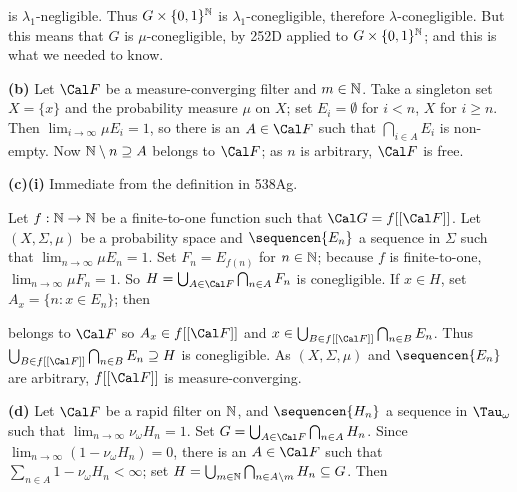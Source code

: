 {

\noindent is $\lambda_1$-negligible.
Thus $G\times\{0,1\}^{\Bbb N}$ is $\lambda_1$-conegligible, therefore
$\lambda$-conegligible.   But this means that $G$ is $\mu$-conegligible, by
252D applied to $G\times\{0,1\}^{\Bbb N}$;  and this is what we
needed to know.

\medskip

{\bf (b)} Let $\Cal F$ be a measure-converging filter and $m\in\Bbb N$.
Take a singleton set $X=\{x\}$ and the probability measure $\mu$ on $X$;
set $E_i=\emptyset$ for $i<n$, $X$ for $i\ge n$.   Then
$\lim_{i\to\infty}\mu E_i=1$, so there is an $A\in\Cal F$ such that
$\bigcap_{i\in A}E_i$ is non-empty.   Now $\Bbb N\setminus n\supseteq A$
belongs to $\Cal F$;  as $n$ is arbitrary, $\Cal F$ is free.

\medskip

{\bf (c)(i)} Immediate from the definition in 538Ag.

\medskip

 Let $f:\Bbb N\to\Bbb N$ be a finite-to-one function such
that $\Cal G=f[[\Cal F]]$.
Let $(X,\Sigma,\mu)$ be a probability space and
$\sequencen{E_n}$ a sequence in $\Sigma$ such that
$\lim_{n\to\infty}\mu E_n=1$.   Set $F_n=E_{f(n)}$ for $n\in\Bbb N$;
because $f$ is finite-to-one, $\lim_{n\to\infty}\mu F_n=1$.   So
$H=\bigcup_{A\in\Cal F}\bigcap_{n\in A}F_n$ is conegligible.   If
$x\in H$, set $A_x=\{n:x\in E_n\}$;  then


\noindent belongs to $\Cal F$ so $A_x\in f[[\Cal F]]$ and
$x\in\bigcup_{B\in f[[\Cal F]]}\bigcap_{n\in B}E_n$.   Thus
$\bigcup_{B\in f[[\Cal F]]}\bigcap_{n\in B}E_n\supseteq H$ is conegligible.
As $(X,\Sigma,\mu)$ and $\sequencen{E_n}$ are arbitrary, $f[[\Cal F]]$ is
measure-converging.

\medskip

{\bf (d)} Let $\Cal F$ be a rapid filter on $\Bbb N$,
and $\sequencen{H_n}$ a sequence in $\Tau_{\omega}$ such that
$\lim_{n\to\infty}\nu_{\omega}H_n=1$.   Set
$G=\bigcup_{A\in\Cal F}\bigcap_{n\in A}H_n$.   Since
$\lim_{n\to\infty}(1-\nu_{\omega}H_n)=0$, there is an $A\in\Cal F$ such
that $\sum_{n\in A}1-\nu_{\omega}H_n<\infty$;   set
$H=\bigcup_{m\in\Bbb N}\bigcap_{n\in A\setminus m}H_n\subseteq G$.
Then


}
